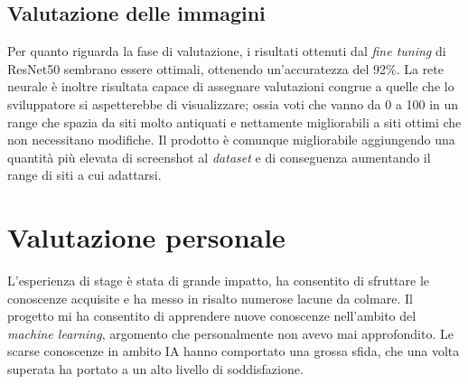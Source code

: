 \subsection{Valutazione delle immagini}
Per quanto riguarda la fase di valutazione, i risultati ottenuti dal \emph{fine tuning} di ResNet50 sembrano essere ottimali, ottenendo un'accuratezza del 92\%.
La rete neurale è inoltre risultata capace di assegnare valutazioni congrue a quelle che lo sviluppatore si aspetterebbe di visualizzare; ossia voti che vanno da 0 a 100 in un range che spazia da siti molto antiquati e nettamente migliorabili a siti ottimi che non necessitano modifiche.
Il prodotto è comunque migliorabile aggiungendo una quantità più elevata di screenshot al \emph{\gls{dataset}} e di conseguenza aumentando il range di siti a cui adattarsi.

\section{Valutazione personale}
L'esperienza di stage è stata di grande impatto, ha consentito di sfruttare le conoscenze acquisite e ha messo in risalto numerose lacune da colmare.
Il progetto mi ha consentito di apprendere nuove conoscenze nell'ambito del \emph{machine learning}, argomento che personalmente non avevo mai approfondito. 
Le scarse conoscenze in ambito IA hanno comportato una grossa sfida, che una volta superata ha portato a un alto livello di soddisfazione.

